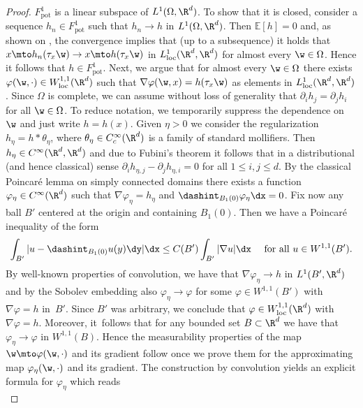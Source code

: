 \begin{proof}
$F_\mathrm{pot}^1$ is a linear subspace of $L^1(\Omega,\R^d)$. To show that it is closed, consider a sequence $h_n\in F_\mathrm{pot}^1$ such that $h_n\to h$ in $L^1(\Omega,\R^d)$. Then $\mathbb{E}[h]=0$ and, as shown on \cite[p.\,224]{JKO}, the convergence implies that (up to a subsequence) it holds that $x\mto h_n(\tau_x\w)\to x\mto h(\tau_x\w)$ in $L^1_\mathrm{loc}(\R^d,\R^d)$ for almost every $\w\in\Omega$. Hence it follows that $h\in F_\mathrm{pot}^1$. Next, we argue that for almost every $\w\in\Omega$ there exists $\varphi(\w,\cdot)\in W^{1,1}_\mathrm{loc}(\R^d)$ such that $\nabla\varphi(\w,x)=h(\tau_x\w)$ as elements in $L^1_\mathrm{loc}(\R^d,\R^d)$. Since $\Omega$ is complete, we can assume without loss of generality that $\partial_ih_j= \partial_jh_i$ for all $\w\in\Omega$. To reduce notation, we temporarily suppress the dependence on $\w$ and just write $h=h(x)$. Given $\eta>0$ we consider the regularization $h_{\eta}=h*\theta_{\eta}$, where $\theta_{\eta}\in C_c^{\infty}(\R^d)$ is a family of standard mollifiers. Then $h_{\eta}\in C^{\infty}(\R^d,\R^d)$ and due to Fubini's theorem it follows that in a distributional (and hence classical) sense $\partial_i h_{\eta,j}-\partial_j h_{\eta,i}=0$ for all $1\leq i,j\leq d$. By the classical Poincaré lemma on simply connected domains there exists a function $\varphi_{\eta}\in C^{\infty}(\R^d)$ such that $\nabla\varphi_{\eta}=h_{\eta}$ and $\dashint_{B_1(0)}\varphi_{\eta}\dx=0$. Fix now any ball $B'$ centered at the origin and containing $B_1(0)$. Then we have a Poincaré inequality of the form
\begin{equation*}
\int_{B'} |u-\dashint_{B_1(0)}u(y)\dy|\dx\leq C(B')\int_{B'}|\nabla u|\dx\quad\text{ for all }u\in W^{1,1}(B').
\end{equation*}
By well-known properties of convolution, we have that $\nabla\varphi_{\eta}\to h$ in $L^1(B',\R^d)$ and by the Sobolev embedding also $\varphi_{\eta}\to \varphi$ for some $\varphi\in W^{1,1}(B')$ with $\nabla \varphi=h$ in~$B'$. Since $B'$ was arbitrary, we conclude that $\varphi\in W^{1,1}_\mathrm{loc}(\R^d)$ with $\nabla \varphi=h$. Moreover, it~follows that for any bounded set $B\subset\R^d$ we have that $\varphi_{\eta}\to \varphi$ in $W^{1,1}(B)$. Hence the measurability properties of the map $\w\mto \varphi(\w,\cdot)$ and its gradient follow once we prove them for the approximating map $\varphi_{\eta}(\w,\cdot)$ and its gradient. The construction by convolution yields an explicit formula for $\varphi_{\eta}$ which reads
\begin{equation*}

\end{equation*}
\end{proof}
